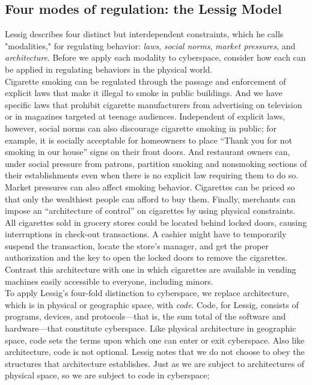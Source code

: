 \documentclass[12pt]{article}
\theoremstyle{definition}
\begin{document}
\subsection{Four modes of regulation: the Lessig Model}
Lessig describes four distinct but interdependent constraints, which he calls "modalities,"
for regulating behavior: \textit{laws}, \textit{social norms}, \textit{market pressures}, and \textit{architecture}. Before we
apply each modality to cyberspace, consider how each can be applied in regulating
behaviors in the physical world.\\
Cigarette smoking can be regulated through the passage and enforcement of explicit
laws that make it illegal to smoke in public buildings. And we have specific laws that
prohibit cigarette manufacturers from advertising on television or in magazines targeted
at teenage audiences. Independent of explicit laws, however, social norms can also
discourage cigarette smoking in public; for example, it is socially acceptable for homeowners
to place “Thank you for not smoking in our house” signs on their front doors.
And restaurant owners can, under social pressure from patrons, partition smoking and
nonsmoking sections of their establishments even when there is no explicit law requiring
them to do so.
Market pressures can also affect smoking behavior. Cigarettes can be priced so that
only the wealthiest people can afford to buy them. Finally, merchants can impose an
“architecture of control” on cigarettes by using physical constraints. All cigarettes sold in
grocery stores could be located behind locked doors, causing interruptions in check-out
transactions. A cashier might have to temporarily suspend the transaction, locate the
store’s manager, and get the proper authorization and the key to open the locked doors to
remove the cigarettes. Contrast this architecture with one in which cigarettes are
available in vending machines easily accessible to everyone, including minors.\\
To apply Lessig’s four-fold distinction to cyberspace, we replace architecture, which is
in physical or geographic space, with \textit{code}. Code, for Lessig, consists of programs, devices,
and protocols—that is, the sum total of the software and hardware—that constitute
cyberspace. Like physical architecture in geographic space, code sets the terms upon
which one can enter or exit cyberspace. Also like architecture, code is not optional. Lessig
notes that we do not choose to obey the structures that architecture establishes. Just as
we are subject to architectures of physical space, so we are subject to code in cyberspace;
\end{document}
